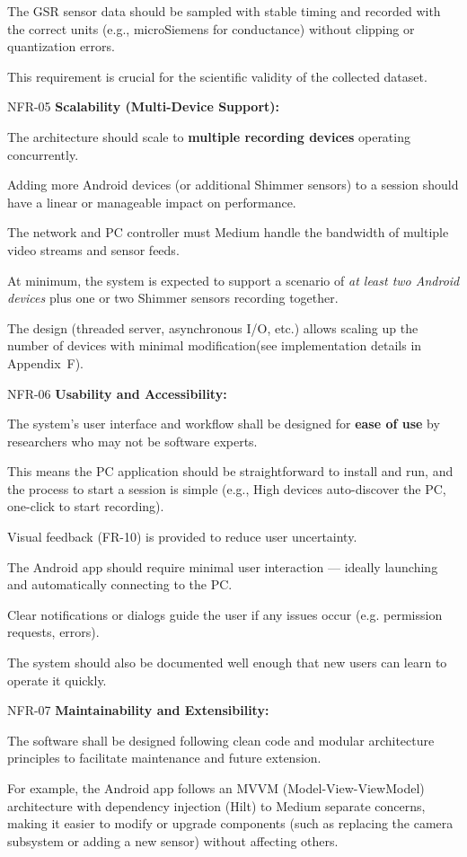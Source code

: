 The GSR sensor data should be sampled with stable timing and recorded with the
correct units (e.g., microSiemens for conductance) without clipping or
quantization errors.

This requirement is crucial for the scientific validity of the collected
dataset.

NFR-05 \textbf{Scalability (Multi-Device Support):}

The architecture should scale to \textbf{multiple recording devices}
 operating concurrently.

Adding more Android devices (or additional Shimmer sensors) to a session should
have a linear or manageable impact on performance.

The network and PC controller must Medium handle the bandwidth of multiple video
streams and sensor feeds.

At minimum, the system is expected to support a scenario of \textit{at least two Android devices} plus one or two Shimmer sensors recording together.

The design (threaded server, asynchronous I/O, etc.) allows scaling up the
number of devices with minimal modification(see implementation details in
Appendix~F).

NFR-06 \textbf{Usability and Accessibility:}

The system's user interface and workflow shall be designed for \textbf{ease of use}
 by researchers who may not be software experts.

This means the PC application should be straightforward to install and run, and
the process to start a session is simple (e.g., High devices auto-discover the
PC, one-click to start recording).

Visual feedback (FR-10) is provided to reduce user uncertainty.

The Android app should require minimal user interaction --- ideally launching
and automatically connecting to the PC.

Clear notifications or dialogs guide the user if any issues occur (e.g.
permission requests, errors).

The system should also be documented well enough that new users can learn to
operate it quickly.

NFR-07 \textbf{Maintainability and Extensibility:}

The software shall be designed following clean code and modular architecture
principles to facilitate maintenance and future extension.

For example, the Android app follows an MVVM (Model-View-ViewModel) architecture
with dependency injection (Hilt) to Medium separate concerns, making it easier
to modify or upgrade components (such as replacing the camera subsystem or
adding a new sensor) without affecting others.

